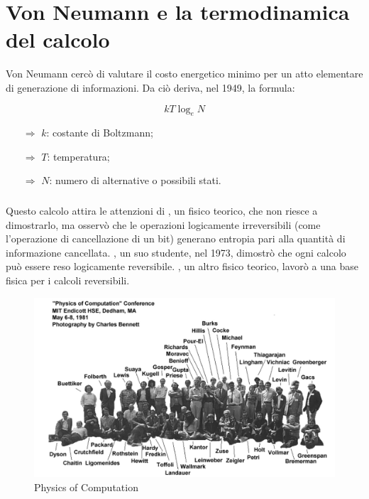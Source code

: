 \section{Von Neumann e la termodinamica del calcolo}

Von Neumann cercò di valutare il costo energetico minimo per un
atto elementare di generazione di informazioni. Da ciò deriva, nel 1949,
la formula:

$$kT \log_e N$$

\begin{itemize}
    \item [$\Rightarrow$] $k$: costante di Boltzmann;
    \item [$\Rightarrow$] $T$: temperatura;
    \item [$\Rightarrow$] $N$: numero di alternative o possibili stati.
\end{itemize}
\subsubsection{}
Questo calcolo attira le attenzioni di , un fisico teorico, 
che non riesce a dimostrarlo, ma osservò che le operazioni logicamente
irreversibili (come l'operazione di cancellazione di un bit) generano entropia
pari alla quantità di informazione cancellata. , un suo studente,
nel 1973, dimostrò che ogni calcolo può essere reso logicamente reversibile.
, un altro fisico teorico, 
lavorò a una base fisica per i calcoli reversibili.


\begin{figure}[h]
    \centering
    \includegraphics[scale=0.3]{images/Comp.png}
    \caption{Physics of Computation}
\end{figure}


